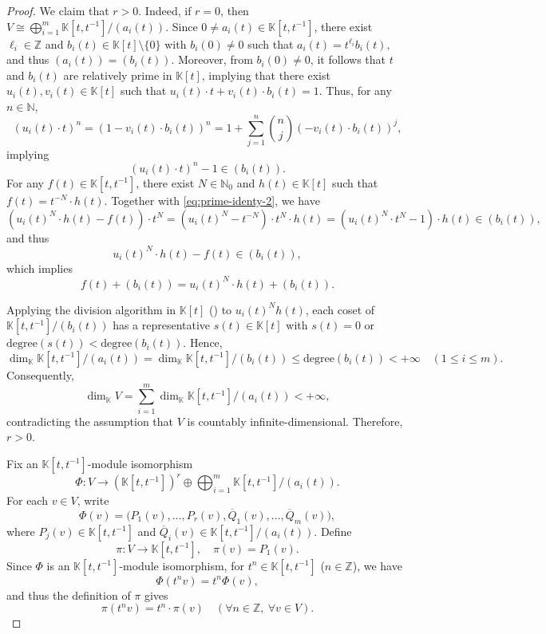 \documentclass[11pt]{amsart}
\theoremstyle{definition}
\theoremstyle{remark}
\theoremstyle{plain}
\begin{document}
\begin{proof}
We claim that \(r>0\). Indeed, if \(r=0\), then
\(V \cong \bigoplus_{i=1}^{m}\mathbb{K}[t,t^{-1}]\big/(a_i(t)).\)
Since \(0\ne a_i(t)\in\mathbb{K}[t,t^{-1}]\), there exist
\(\ell_i\in\mathbb{Z}\) and \(b_i(t)\in\mathbb{K}[t]\setminus\{0\}\)
with \(b_i(0)\ne0\) such that
\(a_i(t)=t^{\ell_i}b_i(t),\) and thus
\((a_i(t))=(b_i(t))\).
Moreover, from \(b_i(0)\ne0\), it follows that \(t\) and \(b_i(t)\) are relatively prime
in \(\mathbb{K}[t]\), implying that there exist
\(u_i(t),v_i(t)\in\mathbb{K}[t]\) such that
\(
u_i(t)\cdot t+v_i(t)\cdot b_i(t)=1.
\)
Thus, for any $n\in \mathbb{N}$,
\begin{equation*}%
(u_i(t)\cdot t)^n=(1-v_i(t)\cdot b_i(t))^n
=1+\sum_{j=1}^n\binom{n}{j}(-v_i(t)\cdot b_i(t))^{j},
\end{equation*}
implying
\begin{equation}\label{eq:prime-identy-2}
(u_i(t)\cdot t)^n-1\in (b_i(t)).
\end{equation}
For any \(f(t)\in\mathbb{K}[t,t^{-1}]\), there exist \(N\in\mathbb{N}_0\) and
\(h(t)\in\mathbb{K}[t]\) such that \(f(t)=t^{-N}\cdot h(t)\).
Together with \eqref{eq:prime-identy-2},
we have
\[
(u_i(t)^N\cdot h(t)-f(t))\cdot t^{N}=(u_i(t)^N-t^{-N})\cdot t^N\cdot h(t)
=(u_i(t)^N\cdot t^{N}-1)\cdot h(t)\in (b_i(t)),
\]
and thus
\[
u_i(t)^N\cdot h(t)-f(t)\in (b_i(t)),
\]
which implies
\[
f(t)+(b_i(t))
=u_i(t)^N\cdot h(t)+(b_i(t)).
\]


Applying the division algorithm in \(\mathbb{K}[t]\)
(\cite[Sec.~9.2, Theorem~3]{DF}) to \(u_i(t)^Nh(t)\), each coset of
\(\mathbb{K}[t,t^{-1}]\big/(b_i(t))\) has a representative
\(s(t)\in\mathbb{K}[t]\) with \(s(t)=0\) or
\(\mathrm{degree}(s(t))<\mathrm{degree}(b_i(t))\). Hence,
\[
\dim_{\mathbb{K}}\mathbb{K}[t,t^{-1}]\big/(a_i(t))
=
\dim_{\mathbb{K}}\mathbb{K}[t,t^{-1}]\big/(b_i(t))
\le\mathrm{degree}(b_i(t))
<+\infty
\quad
(1\le i\le m).
\]
Consequently,
\[
\dim_{\mathbb{K}}V = \sum_{i=1}^{m}
\dim_{\mathbb{K}}\mathbb{K}[t,t^{-1}]\big/(a_i(t))
< +\infty,
\]
contradicting the assumption that \(V\) is countably infinite-dimensional.
Therefore, \(r>0\).

Fix an \(\mathbb{K}[t,t^{-1}]\)-module isomorphism
\[
\Phi:V\to (\mathbb{K}[t,t^{-1}])^{r}
\oplus
\bigoplus_{i=1}^{m}\mathbb{K}[t,t^{-1}]\big/(a_i(t)).
\]
For each \(v\in V\), write
\[
\Phi(v)= \big(P_1(v),\ldots,P_r(v),
\overline{Q}_1(v),\ldots,\overline{Q}_m(v)\big),
\]
where \(P_j(v)\in\mathbb{K}[t,t^{-1}]\) and
\(\overline{Q}_i(v)\in\mathbb{K}[t,t^{-1}]\big/(a_i(t))\).
Define
\[
\pi:V\to\mathbb{K}[t,t^{-1}],
\quad
\pi(v)=P_1(v).
\]
Since \(\Phi\) is an \(\mathbb{K}[t,t^{-1}]\)-module isomorphism,
for $t^{n}\in \mathbb{K}[t,t^{-1}]$ ($n\in \mathbb{Z}$), we have
\[
\Phi(t^n v)=t^n\Phi(v),
\]
and thus the definition of \(\pi\) gives
\begin{equation}\label{eq:R-module-isomorphism-2}
\pi(t^n v)
=
t^n\cdot \pi(v)
\quad(\forall n\in\mathbb{Z},\ \forall v\in V).
\end{equation}


\end{proof}
\end{document}
